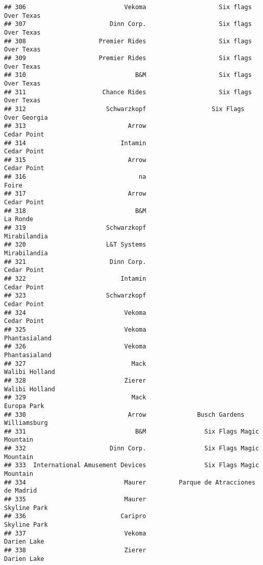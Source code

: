 \documentclass[
]{article}
\begin{document}
\begin{verbatim}
## 306                           Vekoma                    Six flags Over Texas
## 307                       Dinn Corp.                    Six flags Over Texas
## 308                    Premier Rides                    Six flags Over Texas
## 309                    Premier Rides                    Six flags Over Texas
## 310                              B&M                    Six flags Over Texas
## 311                     Chance Rides                    Six flags Over Texas
## 312                      Schwarzkopf                  Six Flags Over Georgia
## 313                            Arrow                             Cedar Point
## 314                          Intamin                             Cedar Point
## 315                            Arrow                             Cedar Point
## 316                               na                                   Foire
## 317                            Arrow                             Cedar Point
## 318                              B&M                                La Ronde
## 319                      Schwarzkopf                            Mirabilandia
## 320                      L&T Systems                            Mirabilandia
## 321                       Dinn Corp.                             Cedar Point
## 322                          Intamin                             Cedar Point
## 323                      Schwarzkopf                             Cedar Point
## 324                           Vekoma                             Cedar Point
## 325                           Vekoma                           Phantasialand
## 326                           Vekoma                           Phantasialand
## 327                             Mack                          Walibi Holland
## 328                           Zierer                          Walibi Holland
## 329                             Mack                             Europa Park
## 330                            Arrow              Busch Gardens Williamsburg
## 331                              B&M                Six Flags Magic Mountain
## 332                       Dinn Corp.                Six Flags Magic Mountain
## 333  International Amusement Devices                Six Flags Magic Mountain
## 334                           Maurer         Parque de Atracciones de Madrid
## 335                           Maurer                            Skyline Park
## 336                          Caripro                            Skyline Park
## 337                           Vekoma                             Darien Lake
## 338                           Zierer                             Darien Lake

\end{verbatim}
\end{document}
